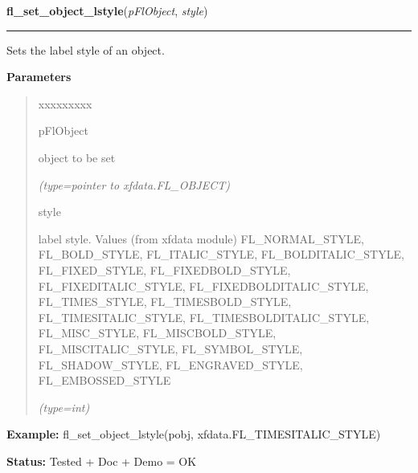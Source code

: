 \hspace{.8\funcindent}\begin{boxedminipage}{\funcwidth}

    \raggedright \textbf{fl\_set\_object\_lstyle}(\textit{pFlObject}, \textit{style})

    \vspace{-1.5ex}

    \rule{\textwidth}{0.5\fboxrule}
\setlength{\parskip}{2ex}
    Sets the label style of an object.

\setlength{\parskip}{1ex}
      \textbf{Parameters}
      \vspace{-1ex}

      \begin{quote}
        \begin{Ventry}{xxxxxxxxx}

          \item[pFlObject]

          object to be set

            {\it (type=pointer to xfdata.FL\_OBJECT)}

          \item[style]

          label style. Values (from xfdata module) FL\_NORMAL\_STYLE, 
          FL\_BOLD\_STYLE, FL\_ITALIC\_STYLE, FL\_BOLDITALIC\_STYLE, 
          FL\_FIXED\_STYLE, FL\_FIXEDBOLD\_STYLE, FL\_FIXEDITALIC\_STYLE, 
          FL\_FIXEDBOLDITALIC\_STYLE, FL\_TIMES\_STYLE, 
          FL\_TIMESBOLD\_STYLE, FL\_TIMESITALIC\_STYLE, 
          FL\_TIMESBOLDITALIC\_STYLE, FL\_MISC\_STYLE, FL\_MISCBOLD\_STYLE,
          FL\_MISCITALIC\_STYLE, FL\_SYMBOL\_STYLE, FL\_SHADOW\_STYLE, 
          FL\_ENGRAVED\_STYLE, FL\_EMBOSSED\_STYLE

            {\it (type=int)}

        \end{Ventry}

      \end{quote}

\textbf{Example:} fl\_set\_object\_lstyle(pobj, xfdata.FL\_TIMESITALIC\_STYLE)



\textbf{Status:} Tested + Doc + Demo = OK



    \end{boxedminipage}

    \label{xformslib:flbasic:fl_get_object_lstyle}

